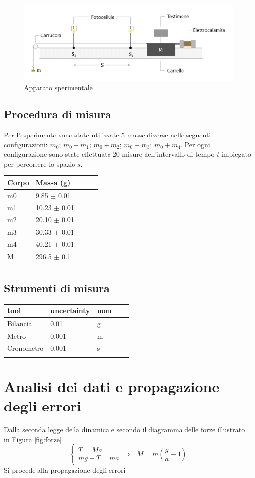 \documentclass[11pt,a4paper]{article}
\begin{document}
\begin{figure}[H]
\includegraphics[scale=0.3]{experimental-setup.png}
\centering
\caption{Apparato sperimentale}
\label{fig:appspe}
\end{figure}

\subsection{Procedura di misura}
Per l'esperimento sono state utilizzate 5 masse diverse nelle seguenti configurazioni: $m_0$; $m_0+m_1$; $m_0+m_2$; $m_0+m_3$; $m_0+m_4$. Per ogni configurazione sono state effettuate 20 misure dell'intervallo di tempo $t$ impiegato per percorrere lo spazio $s$.

\begin{longtable}[]{@{}lllll@{}}
\toprule
Corpo & Massa (g) \tabularnewline
\midrule
\endhead
m0 & 9.85 $\pm$ 0.01 \tabularnewline
m1 & 10.23 $\pm$ 0.01 \tabularnewline
m2 & 20.10 $\pm$ 0.01 \tabularnewline
m3 & 30.33 $\pm$ 0.01 \tabularnewline
m4 & 40.21 $\pm$ 0.01 \tabularnewline
M & 296.5 $\pm$ 0.1 \tabularnewline
\bottomrule
\label{masses}
\end{longtable}

\subsection{Strumenti di misura}

\begin{longtable}[]{@{}lllll@{}}
\toprule
tool & uncertainty & uom \tabularnewline
\midrule
\endhead
Bilancia & 0.01 & g \tabularnewline
Metro & 0.001 & m \tabularnewline
Cronometro & 0.001 & s \tabularnewline
\bottomrule
\label{tools}
\end{longtable}

\section{Analisi dei dati e propagazione degli errori}
Dalla seconda legge della dinamica e secondo il diagramma delle forze illustrato in Figura \ref{fig:forze}
\begin{equation}
    \begin{cases}
    T=Ma \\
    mg-T=ma
    \end{cases}
    \Longrightarrow \; \; M=m \left( \frac{g}{a} -1 \right)
\end{equation}
Si procede alla propagazione degli errori
\end{document}
